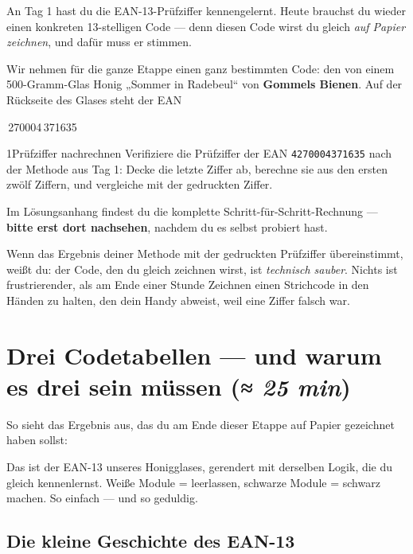 An Tag 1 hast du die EAN-13-Prüfziffer kennengelernt. Heute brauchst
du wieder einen konkreten 13-stelligen Code — denn diesen Code wirst
du gleich \emph{auf Papier zeichnen}, und dafür muss er stimmen.

Wir nehmen für die ganze Etappe einen ganz bestimmten Code: den von
einem 500-Gramm-Glas Honig „Sommer in Radebeul“ von \textbf{Gommels
Bienen}. Auf der Rückseite des Glases steht der EAN

\begin{center}
{\Large{}\,270004\,371635}
\end{center}

\begin{bleistiftuebung}{1}{Prüfziffer nachrechnen}
Verifiziere die Prüfziffer der EAN \texttt{4270004371635} nach der
Methode aus Tag 1: Decke die letzte Ziffer ab, berechne sie aus den
ersten zwölf Ziffern, und vergleiche mit der gedruckten Ziffer.

Im Lösungsanhang findest du die komplette Schritt-für-Schritt-Rechnung —
\textbf{bitte erst dort nachsehen}, nachdem du es selbst probiert hast.
\end{bleistiftuebung}

Wenn das Ergebnis deiner Methode mit der gedruckten Prüfziffer
übereinstimmt, weißt du: der Code, den du gleich zeichnen wirst, ist
\emph{technisch sauber}. Nichts ist frustrierender, als am Ende einer
Stunde Zeichnen einen Strichcode in den Händen zu halten, den dein
Handy abweist, weil eine Ziffer falsch war.

\section{Drei Codetabellen — und warum es drei sein müssen \normalfont(\textit{≈ 25 min})}

So sieht das Ergebnis aus, das du am Ende dieser Etappe auf Papier
gezeichnet haben sollst:

\begin{center}
\end{center}

Das ist der EAN-13 unseres Honigglases, gerendert mit derselben Logik,
die du gleich kennenlernst. Weiße Module = leerlassen, schwarze Module =
schwarz machen. So einfach — und so geduldig.

\subsection*{Die kleine Geschichte des EAN-13}

